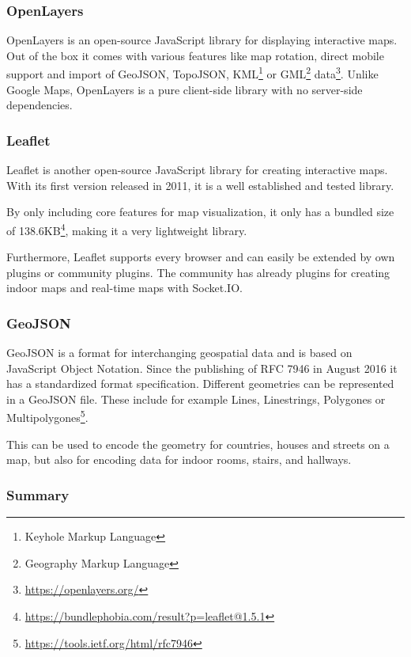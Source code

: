 \subsubsection{OpenLayers}
\label{OpenLayers}

OpenLayers is an open-source JavaScript library for displaying interactive maps. Out of the box it comes with various features like map rotation, direct mobile support and import of GeoJSON, TopoJSON, KML\footnote{Keyhole Markup Language} or GML\footnote{Geography Markup Language} data\footnote{\url{https://openlayers.org/}}. Unlike Google Maps, OpenLayers is a pure client-side library with no server-side dependencies. 

\subsubsection{Leaflet}
\label{Leaflet}

Leaflet is another open-source JavaScript library for creating interactive maps. With its first version released in 2011, it is a well established and tested library. 

By only including core features for map visualization, it only has a bundled size of 138.6KB\footnote{\url{https://bundlephobia.com/result?p=leaflet@1.5.1}}, making it a very lightweight library.

Furthermore, Leaflet supports every browser and can easily be extended by own plugins or community plugins.
The community has already plugins for creating indoor maps \cite{baines_provides_2019} and real-time maps with Socket.IO.

\subsubsection{GeoJSON}
\label{GeoJSON}

GeoJSON is a format for interchanging geospatial data and is based on JavaScript Object Notation. Since the publishing of RFC 7946 in August 2016 it has a standardized format specification.
Different geometries can be represented in a GeoJSON file. These include for example Lines, Linestrings, Polygones or Multipolygones\footnote{\url{https://tools.ietf.org/html/rfc7946}}. 

This can be used to encode the geometry for countries, houses and streets on a map, but also for encoding data for indoor rooms, stairs, and hallways.

\subsubsection{Summary}

